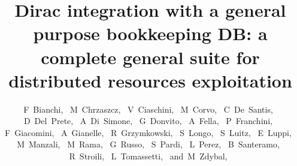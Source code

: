 \documentclass[journal]{IEEEtran}
\begin{document}
\title{Dirac integration with a general purpose bookkeeping DB: a complete general suite for distributed resources exploitation}
%
%

\author{F~Bianchi,~
        M~Chrzaszcz,~
        V~Ciaschini,~
        M~Corvo,~
        C~De~Santis,~
        D~Del~Prete,~
        A~Di~Simone,~
        G~Donvito,~
        A~Fella,~
        P~Franchini,~
        F~Giacomini,~
        A~Gianelle,~
        R~Grzymkowski,~        
        S~Longo,~        
        S~Luitz,~        
        E~Luppi,~               
        M~Manzali,~
        M~Rama,~
        G~Russo,~
        S~Pardi,~
        L~Perez,~
        B~Santeramo,~
        R~Stroili,~
        L~Tomassetti,~        
        and~M~Zdybal,~%

}
\end{document}
